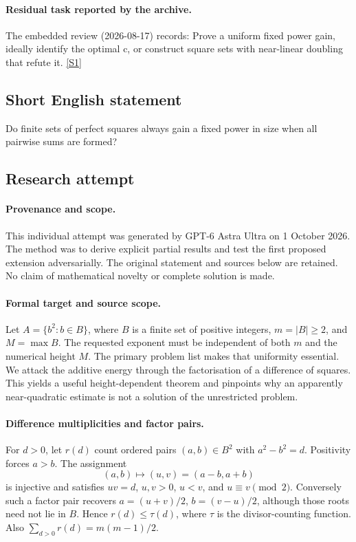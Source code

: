 \documentclass[11pt,a4paper]{article}
\newcommand{\sref}[2]{\hyperlink{source:#1:#2}{[S#2]}}
\begin{document}
\paragraph{Residual task reported by the archive.}

The embedded review (2026-08-17) records: Prove a uniform fixed power gain, ideally identify the optimal c, or construct square sets with near-linear doubling that refute it. \sref{121}{1}

\subsection{Short English statement}

Do finite sets of perfect squares always gain a fixed power in size when all pairwise sums are formed?

\subsection{Research attempt}

\paragraph{Provenance and scope.}
This individual attempt was generated by GPT-6 Astra Ultra on 1 October 2026. The method was to derive explicit partial results and test the first proposed extension adversarially. The original statement and sources below are retained. No claim of mathematical novelty or complete solution is made.

\paragraph{Formal target and source scope.}
Let $A=\{b^2:b\in B\}$, where $B$ is a finite set of positive integers, $m=|B|\geq2$, and $M=\max B$. The requested exponent must be independent of both $m$ and the numerical height $M$. The primary problem list makes that uniformity essential. We attack the additive energy through the factorisation of a difference of squares. This yields a useful height-dependent theorem and pinpoints why an apparently near-quadratic estimate is not a solution of the unrestricted problem.

\paragraph{Difference multiplicities and factor pairs.}
For $d>0$, let $r(d)$ count ordered pairs $(a,b)\in B^2$ with $a^2-b^2=d$. Positivity forces $a>b$. The assignment
\[
 (a,b)\longmapsto(u,v)=(a-b,a+b)
\]
is injective and satisfies $uv=d$, $u,v>0$, $u<v$, and $u\equiv v\pmod2$. Conversely such a factor pair recovers $a=(u+v)/2$, $b=(v-u)/2$, although those roots need not lie in $B$. Hence $r(d)\leq\tau(d)$, where $\tau$ is the divisor-counting function. Also $\sum_{d>0}r(d)=m(m-1)/2$.
\end{document}
